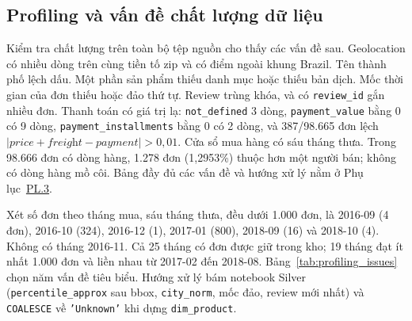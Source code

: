 \documentclass[a4paper]{article}
\begin{document}
\subsection{Profiling và vấn đề chất lượng dữ liệu}
\label{subsec:3_2}

Kiểm tra chất lượng trên toàn bộ tệp nguồn cho thấy các vấn đề sau. Geolocation có nhiều dòng trên cùng tiền tố zip và có điểm ngoài khung Brazil. Tên thành phố lệch dấu. Một phần sản phẩm thiếu danh mục hoặc thiếu bản dịch. Mốc thời gian của đơn thiếu hoặc đảo thứ tự. Review trùng khóa, và có \texttt{review\_id} gắn nhiều đơn. Thanh toán có giá trị lạ: \texttt{not\_defined} 3 dòng, \texttt{payment\_value} bằng 0 có 9 dòng, \texttt{payment\_installments} bằng 0 có 2 dòng, và 387/98.665 đơn lệch $\lvert \textit{price} + \textit{freight} - \textit{payment} \rvert > 0{,}01$. Cửa sổ mua hàng có sáu tháng thưa. Trong 98.666 đơn có dòng hàng, 1.278 đơn (1,2953\%) thuộc hơn một người bán; không có dòng hàng mồ côi. Bảng đầy đủ các vấn đề và hướng xử lý nằm ở Phụ lục~\hyperref[pl:3]{PL.3}.

Xét số đơn theo tháng mua, sáu tháng thưa, đều dưới 1.000 đơn, là 2016-09 (4 đơn), 2016-10 (324), 2016-12 (1), 2017-01 (800), 2018-09 (16) và 2018-10 (4). Không có tháng 2016-11. Cả 25 tháng có đơn được giữ trong kho; 19 tháng đạt ít nhất 1.000 đơn và liền nhau từ 2017-02 đến 2018-08. Bảng~\ref{tab:profiling_issues} chọn năm vấn đề tiêu biểu. Hướng xử lý bám notebook Silver (\texttt{percentile\_approx} sau bbox, \texttt{city\_norm}, mốc đảo, review mới nhất) và \texttt{COALESCE} về \texttt{'Unknown'} khi dựng \texttt{dim\_product}.
\end{document}
